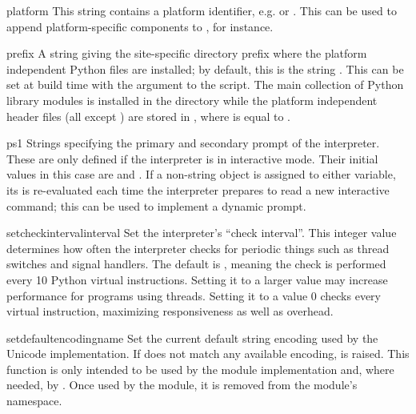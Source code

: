 \begin{datadesc}{platform}
This string contains a platform identifier, e.g.  or
.  This can be used to append platform-specific
components to , for instance. 
\end{datadesc}

\begin{datadesc}{prefix}
A string giving the site-specific directory prefix where the platform
independent Python files are installed; by default, this is the string
.  This can be set at build time with the
 argument to the
 script.  The main collection of Python library
modules is installed in the directory  while the platform independent header
files (all except ) are stored in , where  is equal to
.
\end{datadesc}

\begin{datadesc}{ps1}
  Strings specifying the primary and secondary prompt of the
  interpreter.  These are only defined if the interpreter is in
  interactive mode.  Their initial values in this case are
   and .  If a non-string object is assigned
  to either variable, its  is re-evaluated each time
  the interpreter prepares to read a new interactive command; this can
  be used to implement a dynamic prompt.
\end{datadesc}

\begin{funcdesc}{setcheckinterval}{interval}
Set the interpreter's ``check interval''.  This integer value
determines how often the interpreter checks for periodic things such
as thread switches and signal handlers.  The default is , meaning
the check is performed every 10 Python virtual instructions.  Setting
it to a larger value may increase performance for programs using
threads.  Setting it to a value \code{<=} 0 checks every virtual instruction,
maximizing responsiveness as well as overhead.
\end{funcdesc}

\begin{funcdesc}{setdefaultencoding}{name}
  Set the current default string encoding used by the Unicode
  implementation.  If  does not match any available
  encoding,  is raised.  This function is only
  intended to be used by the  module implementation
  and, where needed, by .  Once used by the
   module, it is removed from the 
  module's namespace.
\end{funcdesc}

